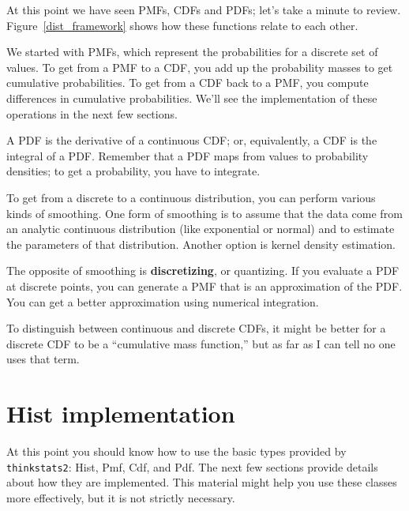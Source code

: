 \documentclass[12pt]{book}
\theoremstyle{exercise}
\begin{document}
At this point we have seen PMFs, CDFs and PDFs; let's take a minute
to review.  Figure~\ref{dist_framework} shows how these functions relate
to each other.%
%
%

We started with PMFs, which represent the probabilities for a discrete
set of values.  To get from a PMF to a CDF, you add up the probability
masses to get cumulative probabilities.  
To get from a CDF back to a PMF, you compute differences in cumulative
probabilities.  We'll see the implementation of these operations
in the next few sections.%

A PDF is the derivative of a continuous CDF; or, equivalently,
a CDF is the integral of a PDF.  Remember that a PDF maps from
values to probability densities; to get a probability, you have to
integrate.%
%
%

To get from a discrete to a continuous distribution, you can perform
various kinds of smoothing.  One form of smoothing is to assume that
the data come from an analytic continuous distribution
(like exponential or normal) and to estimate the parameters of that
distribution.  Another option is kernel density estimation.%
%
%
%
%
%

The opposite of smoothing is {\bf discretizing}, or quantizing.  If you
evaluate a PDF at discrete points, you can generate a PMF that is an
approximation of the PDF.  You can get a better approximation using
numerical integration.%
%
%

To distinguish between continuous and discrete CDFs, it might be
better for a discrete CDF to be a ``cumulative mass function,'' but as
far as I can tell no one uses that term.%



\section{Hist implementation}

At this point you should know how to use the basic types provided
by {\tt thinkstats2}: Hist, Pmf, Cdf, and Pdf.  The next few sections
provide details about how they are implemented.  This material
might help you use these classes more effectively, but it is not
strictly necessary.%
\end{document}
